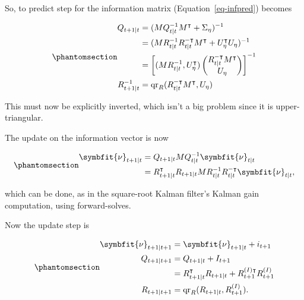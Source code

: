 \documentclass[
]{report}
\newcommand{\bv}[1]{\symbfit{#1}}
\theoremstyle{plain}
\theoremstyle{plain}
\theoremstyle{plain}
\theoremstyle{remark}
\begin{document}
So, to predict step for the information matrix
(Equation~\ref{eq-infpred}) becomes

\begin{equation}\phantomsection\label{eq-sqrtinfpred}{\begin{split}
  Q_{t+1\mid t} &= (M Q_{t\mid t}^{-1} M^\intercal + \Sigma_\eta)^{-1}\\
  &= (M R_{t\mid t}^{-1}R_{t\mid t}^{-\intercal} M^\intercal + U_\eta^\intercal U_\eta)^{-1}\\
  &= \left[(M R_{t\mid t}^{-1}, U_\eta^\intercal)\left(\begin{matrix}R_{t\mid t}^{-\intercal} M^\intercal\\U_\eta\end{matrix}\right)\right]^{-1}\\
  R_{t+1\mid t}^{-1} &= \mathrm{qr}_R(R_{t\mid t}^{-\intercal} M^\intercal, U_\eta)
\end{split}
}\end{equation}

This must now be explicitly inverted, which isn't a big problem since it
is upper-triangular.

The update on the information vector is now

\begin{equation}\phantomsection\label{eq-sqrtinfopred2}{\begin{split}
\bv\nu_{t+1\mid t} &= Q_{t+1\mid t} M Q_{t\mid t}^{-1} \bv \nu_{t\mid t}\\
&= R_{t+1\mid t}^\intercal R_{t+1\mid t} M R_{t\mid t}^{-1}R_{t\mid t}^{-\intercal} \bv \nu_{t\mid t}, 
\end{split}
}\end{equation}

which can be done, as in the square-root Kalman filter's Kalman gain
computation, using forward-solves.

Now the update step is

\begin{equation}\phantomsection\label{eq-sqrtinfup}{\begin{split}
  \bv\nu_{t+1\mid t+1} &= \bv\nu_{t+1\mid t} + i_{t+1}\\
  Q_{t+1\mid t+1} &= Q_{t+1\mid t} + I_{t+1}\\
  &= R_{t+1\mid t}^\intercal R_{t+1\mid t} + R^{(I)\intercal}_{t+1}R^{(I)}_{t+1}\\
  R_{t+1\mid t+1}  &= \mathrm{qr}_R(R_{t+1\mid t}, R^{(I)}_{t+1}). 
\end{split}
}\end{equation}
\end{document}
